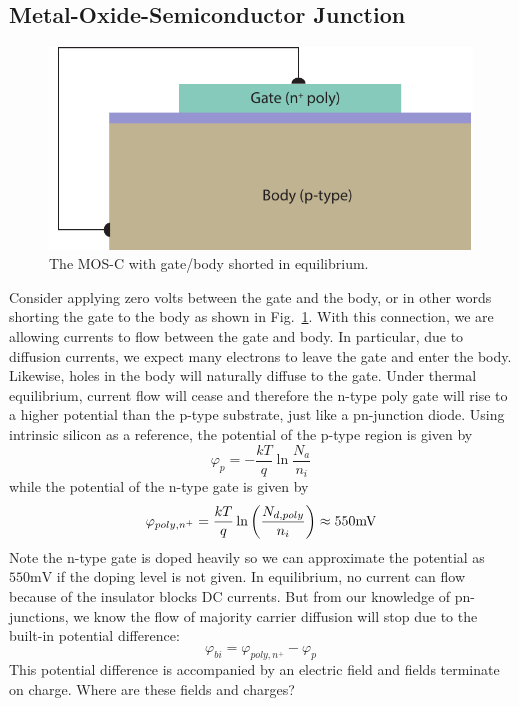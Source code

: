 \subsection{Metal-Oxide-Semiconductor Junction}

\begin{figure}[tbh]
\begin{center}
\includegraphics[width=.75\columnwidth]{mos_cap_wire_short}
\end{center}
\caption{The MOS-C with gate/body shorted in equilibrium. } \label{fig:mos_cap_gate_body_short}
\end{figure}

Consider applying zero volts between the gate and the body, or in other words shorting the gate to the body as shown in Fig.~\ref{fig:mos_cap_gate_body_short}.   With this connection, we are allowing currents to flow between the gate and body.  In particular, due to diffusion currents, we expect many electrons to leave the gate and enter the body. Likewise, holes in the body will naturally diffuse to the gate.  Under thermal equilibrium, current flow will cease and therefore the n-type poly gate will rise to a higher potential than the p-type substrate, just like a pn-junction diode.  Using intrinsic silicon as a reference, the potential of the p-type region is given by
%
\begin{equation}
{\varphi _p} =  - \frac{{kT}}{q}\ln \frac{{{N_a}}}{{{n_i}}}
\end{equation}
while the potential of the n-type gate is given by
%
\begin{equation}
{\varphi _{poly,{n^ + }}} = \frac{{kT}}{q}\ln \left( {\frac{{{N_{d,poly}}}}{{{n_i}}}} \right) 
\approx 550{\rm{mV}}
\end{equation}
%
Note the n-type gate is doped heavily so we can approximate the potential as $550\mathrm{mV}$ if the doping level is not given.  In equilibrium, no current can flow because of the insulator blocks DC currents.  But from our knowledge of pn-junctions, we know the flow of majority carrier diffusion will stop due to the built-in potential difference:
\begin{equation}
	\varphi_{bi} = {\varphi _{poly,{n^ + }}}  - {\varphi _p} 
\end{equation}
This potential difference is accompanied by an electric field and fields terminate on charge.  Where are these fields and charges?
 

